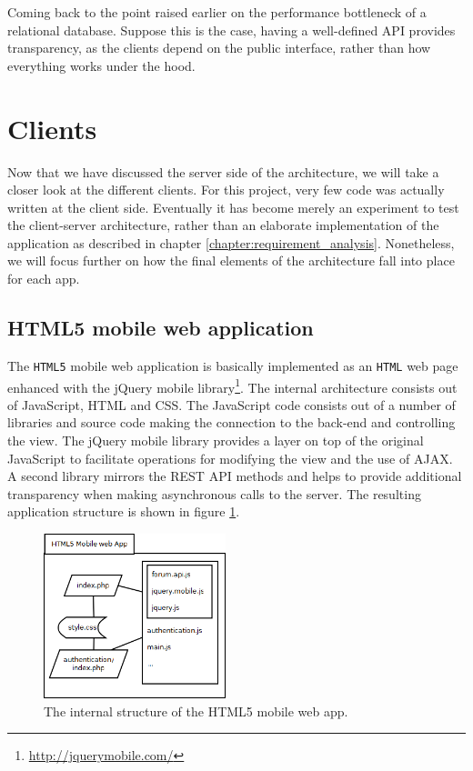 Coming back to the point raised earlier on the performance bottleneck of a relational database. Suppose this is the case, having a well-defined API provides transparency, as the clients depend on the public interface, rather than how everything works under the hood.



\section{Clients}

Now that we have discussed the server side of the architecture, we will take a closer look at the different clients. For this project, very few code was actually written at the client side. Eventually it has become merely an experiment to test the client-server architecture, rather than an elaborate implementation of the application as described in chapter \ref{chapter:requirement_analysis}. Nonetheless, we will focus further on how the final elements of the architecture fall into place for each app.


\subsection{HTML5 mobile web application}

The \texttt{HTML5} mobile web application is basically implemented as an \texttt{HTML} web page enhanced with the jQuery mobile library\footnote{\url{http://jquerymobile.com/}}. The internal architecture consists out of JavaScript, HTML and CSS. The JavaScript code consists out of a number of libraries and source code making the connection to the back-end and controlling the view. The jQuery mobile library provides a layer on top of the original JavaScript to facilitate operations for modifying the view and the use of AJAX. A second library mirrors the REST API methods and helps to provide additional transparency when making asynchronous calls to the server. The resulting application structure is shown in figure \ref{figure:html5:architecture}.

\begin{figure}
	\begin{center}
		\includegraphics[width=200px]{img/html5_architecture}
		\caption{The internal structure of the HTML5 mobile web app.}
		\label{figure:html5:architecture}
	\end{center}
\end{figure}


